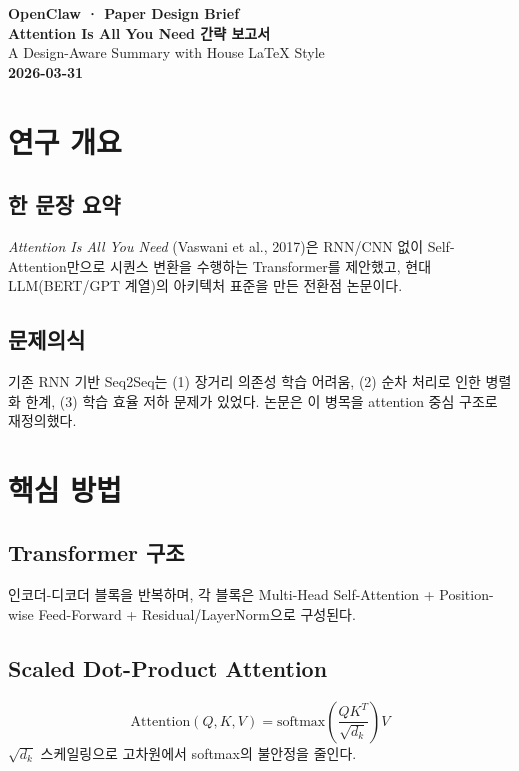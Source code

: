 \documentclass[11pt,a4paper]{article}
\newenvironment{keybox}[2]{%
  \begin{tcolorbox}[colback=#1, colframe=dgistblue!60,
    title={\small\bfseries\color{white}#2},
    coltitle=white, colbacktitle=dgistblue,
    left=6pt, right=6pt, top=4pt, bottom=4pt,
    boxrule=0.6pt]
}{\end{tcolorbox}}
\begin{document}
\begin{titlepage}
\pagecolor{dgistnavy}
\color{white}
\vspace*{1.4cm}
\begin{center}
{\small\color{dgistlight}\textbf{OpenClaw · Paper Design Brief}}\\[1.1cm]
{\Large\bfseries\color{white}Attention Is All You Need 간략 보고서}\\[0.5cm]
{\normalsize\color{dgistlight}A Design-Aware Summary with House LaTeX Style}\\[1.2cm]
{\Large\bfseries\color{dgistlight}2026-03-31}
\vfill
\end{center}
\end{titlepage}
\pagecolor{white}\color{black}

\tableofcontents
\newpage

\section{연구 개요}
\subsection{한 문장 요약}
\begin{keybox}{bglight}{핵심 요약}
\textit{Attention Is All You Need} (Vaswani et al., 2017)은 RNN/CNN 없이 Self-Attention만으로 시퀀스 변환을 수행하는 Transformer를 제안했고,
현대 LLM(BERT/GPT 계열)의 아키텍처 표준을 만든 전환점 논문이다.
\end{keybox}

\subsection{문제의식}
기존 RNN 기반 Seq2Seq는 (1) 장거리 의존성 학습 어려움, (2) 순차 처리로 인한 병렬화 한계, (3) 학습 효율 저하 문제가 있었다.
논문은 이 병목을 attention 중심 구조로 재정의했다.

\section{핵심 방법}
\subsection{Transformer 구조}
인코더-디코더 블록을 반복하며, 각 블록은 Multi-Head Self-Attention + Position-wise Feed-Forward + Residual/LayerNorm으로 구성된다.

\subsection{Scaled Dot-Product Attention}
\[
\mathrm{Attention}(Q,K,V)=\mathrm{softmax}\left(\frac{QK^T}{\sqrt{d_k}}\right)V
\]
$\sqrt{d_k}$ 스케일링으로 고차원에서 softmax의 불안정을 줄인다.
\end{document}
